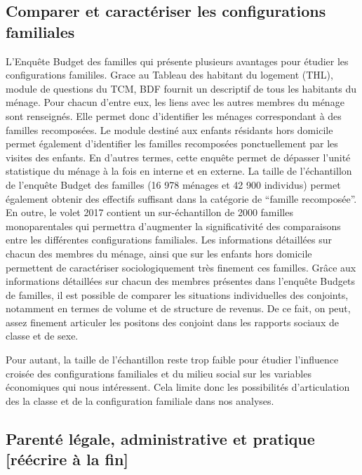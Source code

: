 \documentclass[
  12pt,
]{book}
\begin{document}
\subsection{Comparer et caractériser les configurations
familiales}\label{comparer-et-caractuxe9riser-les-configurations-familiales}

L'Enquête Budget des familles qui présente plusieurs avantages pour
étudier les configurations famililes. Grace au Tableau des habitant du
logement (THL), module de questions du TCM, BDF fournit un descriptif de
tous les habitants du ménage. Pour chacun d'entre eux, les liens avec
les autres membres du ménage sont renseignés. Elle permet donc
d'identifier les ménages correspondant à des familles recomposées. Le
module destiné aux enfants résidants hors domicile permet également
d'identifier les familles recomposées ponctuellement par les visites des
enfants. En d'autres termes, cette enquête permet de dépasser l'unité
statistique du ménage à la fois en interne et en externe. La taille de
l'échantillon de l'enquête Budget des familles (16 978 ménages et 42 900
individus) permet également obtenir des effectifs suffisant dans la
catégorie de ``famille recomposée''. En outre, le volet 2017 contient un
sur-échantillon de 2000 familles monoparentales qui permettra
d'augmenter la significativité des comparaisons entre les différentes
configurations familiales. Les informations détaillées sur chacun des
membres du ménage, ainsi que sur les enfants hors domicile permettent de
caractériser sociologiquement très finement ces familles. Grâce aux
informations détaillées sur chacun des membres présentes dans l'enquête
Budgets de familles, il est possible de comparer les situations
individuelles des conjoints, notamment en termes de volume et de
structure de revenus. De ce fait, on peut, assez finement articuler les
positons des conjoint dans les rapports sociaux de classe et de sexe.

Pour autant, la taille de l'échantillon reste trop faible pour étudier
l'influence croisée des configurations familiales et du milieu social
sur les variables économiques qui nous intéressent. Cela limite donc les
possibilités d'articulation des la classe et de la configuration
familiale dans nos analyses.

\subsection{Parenté légale, administrative et pratique {[}réécrire à la
fin{]}}\label{parentuxe9-luxe9gale-administrative-et-pratique-ruxe9uxe9crire-uxe0-la-fin}
\end{document}
